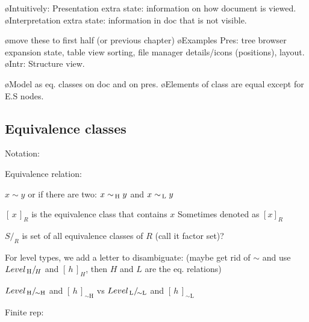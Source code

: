 \bl
\o Intuitively: Presentation extra state: information on how document is viewed. 
\o Interpretation extra state: information in doc that is not visible. 
\el

\bl
\o move these to first half (or previous chapter)
\o Examples Pres: tree browser expansion state, table view sorting, file manager details/icons (positions), layout.
\o Intr: Structure view.
\el

\bl
\o Model as eq. classes on doc and on pres.
\o Elements of class are equal except for E.S nodes.
\el


\subsection{Equivalence classes}

\newcommand{\Eqclass}[2]{{#1}/_{\!{#2}}}
\newcommand{\eqclass}[2]{[\,{#1}\,]_{#2}}

\newcommand{\Eqcl}[2]{\Eqclass{#1}{\sim {\mathrm #2}}}
\newcommand{\eqcl}[2]{\eqclass{#1}{\sim {\mathrm #2}}}
\newcommand{\eqstarcl}[2]{{#1}/_{\!\stackrel{*}{\sim} {\mathrm #2}}}

\newcommand{\eqr}{\ensuremath{\sim}}
\newcommand{\eqstar}{\ensuremath{\stackrel{*}{\sim}}}

\newcommand{\reuze}{\ensuremath{\triangleright}}
\newcommand{\reuzestar}{\ensuremath{\stackrel{*}{\triangleright}}}

Notation:

Equivalence relation:

$x \eqr y$ or if there are two:  $x \eqr\H y$  and $x \eqr\L y$ 


$\eqclass{x}{R}$ is the equivalence class that contains $x$ Sometimes denoted as $[x]_R$

\xpr{
\eqclass{x}{R} = \setof{y}{x R y}
}


$\Eqclass{S}{R}$ is set of all equivalence classes of $R$ (call it factor set)?
\xpr{
S\Eqclass{}{R} = \setof{x\eqclass{}{R}}{ x \in S}
}


For level types, we add a letter to disambiguate: (maybe get rid of $\sim$ and use $\Eqclass{Level\H}{H}$ and $\eqclass{h}{H}$, then $H$ and $L$ are the eq. relations)

$\Eqcl{Level\H}{H}$ and $\eqcl{h}{H}$ vs $\Eqcl{Level\L}{L}$ and $\eqcl{h}{L}$ 

Finite rep:

